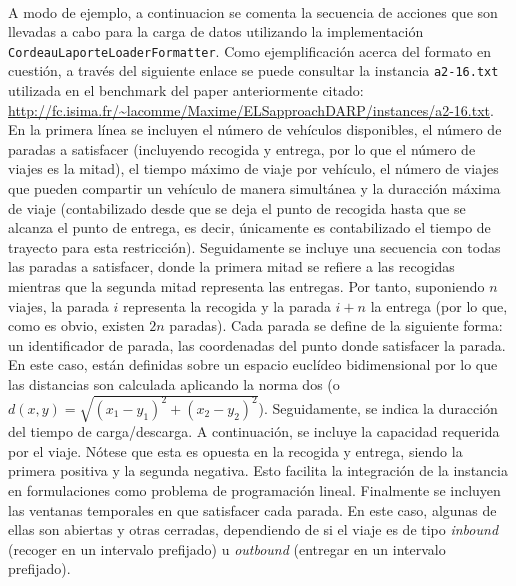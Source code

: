 \documentclass{subfiles}
\begin{document}
          \paragraph{}
          A modo de ejemplo, a continuacion se comenta la secuencia de acciones que son llevadas a cabo para la carga de datos utilizando la implementación \texttt{CordeauLaporteLoaderFormatter}. Como ejemplificación acerca del formato en cuestión, a través del siguiente enlace se puede consultar la instancia \texttt{a2-16.txt} utilizada en el benchmark del paper anteriormente citado: \url{http://fc.isima.fr/~lacomme/Maxime/ELSapproachDARP/instances/a2-16.txt}. En la primera línea se incluyen el número de vehículos disponibles, el número de paradas a satisfacer (incluyendo recogida y entrega, por lo que el número de viajes es la mitad), el tiempo máximo de viaje por vehículo, el número de viajes que pueden compartir un vehículo de manera simultánea y la duracción máxima de viaje (contabilizado desde que se deja el punto de recogida hasta que se alcanza el punto de entrega, es decir, únicamente es contabilizado el tiempo de trayecto para esta restricción). Seguidamente se incluye una secuencia con todas las paradas a satisfacer, donde la primera mitad se refiere a las recogidas mientras que la segunda mitad representa las entregas. Por tanto, suponiendo $n$ viajes, la parada $i$ representa la recogida y la parada $i + n$ la entrega (por lo que, como es obvio, existen $2n$ paradas). Cada parada se define de la siguiente forma: un identificador de parada, las coordenadas del punto donde satisfacer la parada. En este caso, están definidas sobre un espacio euclídeo bidimensional por lo que las distancias son calculada aplicando la norma dos (o $d(x, y) = \sqrt{(x_{1} - y_{1}) ^ 2 + (x_{2} - y_{2}) ^ 2}$). Seguidamente, se indica la duracción del tiempo de carga/descarga. A continuación, se incluye la capacidad requerida por el viaje. Nótese que esta es opuesta en la recogida y entrega, siendo la primera positiva y la segunda negativa. Esto facilita la integración de la instancia en formulaciones como problema de programación lineal. Finalmente se incluyen las ventanas temporales en que satisfacer cada parada. En este caso, algunas de ellas son abiertas y otras cerradas, dependiendo de si el viaje es de tipo \emph{inbound} (recoger en un intervalo prefijado) u \emph{outbound} (entregar en un intervalo prefijado).
\end{document}
